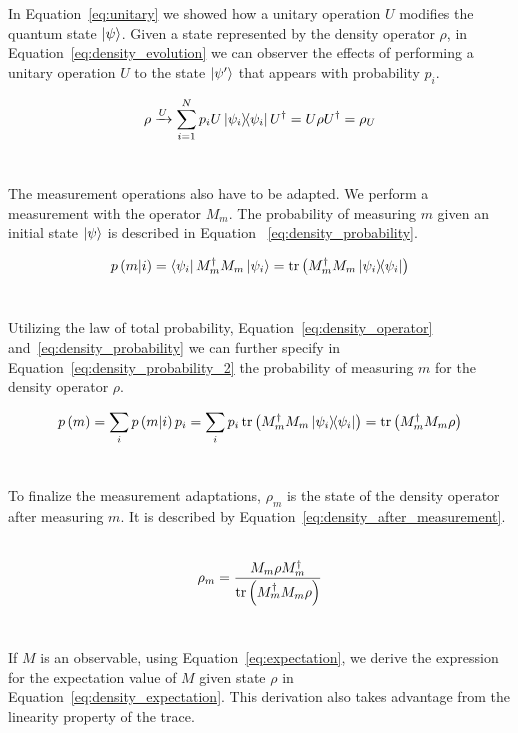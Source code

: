 In Equation~\ref{eq:unitary} we showed how a unitary operation \(U\) modifies
the quantum state \(\ket{\psi}\). Given a state represented by the density
operator \(\rho\), in Equation~\ref{eq:density_evolution} we can observer the
effects of performing a unitary operation \(U\) to the state \(\ket{\psi'}\)
that appears with probability \(p_i\). \

\begin{equation}\label{eq:density_evolution}
  \rho \xrightarrow{U} \sum_{i=1}^{N}p_{i}U\ketbra{\psi_i}{\psi_i}U^{\dag} =
  U\rho U^{\dag} = \rho_{U}
\end{equation} \

The measurement operations also have to be adapted. We perform a
measurement with the operator \(M_m\). The probability of measuring
\(m\) given an initial state \(\ket{\psi}\) is described in Equation
~\ref{eq:density_probability}. \

\begin{equation}\label{eq:density_probability}
  p\left(m|i\right) = \bra{\psi_i}M_{m}^{\dag}M_{m}\ket{\psi_i} =
  \trace\left(M_{m}^{\dag}M_{m}\ketbra{\psi_i}{\psi_i}\right)
\end{equation} \

Utilizing the law of total probability, Equation~\ref{eq:density_operator}
and~\ref{eq:density_probability} we can further specify in 
Equation~\ref{eq:density_probability_2} the probability of measuring
\(m\) for the density operator \(\rho\). \

\begin{equation}\label{eq:density_probability_2}
  p\left(m\right) = \sum_{i}p\left(m|i\right)p_{i} =
  \sum_{i}p_{i}\trace\left(M_{m}^{\dag}M_{m}\ketbra{\psi_i}{\psi_i}\right) =
  \trace\left(M_{m}^{\dag}M_{m}\rho \right)
\end{equation} \

To finalize the measurement adaptations, \(\rho_m\) is the state of
the density operator after measuring \(m\). It is described by
Equation~\ref{eq:density_after_measurement}. \

\begin{equation}\label{eq:density_after_measurement}
  \rho_m = 
  \frac{M_{m}\rho M_{m}^{\dag}}{\trace\left(M_{m}^{\dag}M_{m}\rho\right)}
\end{equation} \

If \(M\) is an observable, using Equation~\ref{eq:expectation}, we derive
the expression for the expectation value of \(M\) given state \(\rho\)
in Equation~\ref{eq:density_expectation}. This derivation also takes 
advantage from the linearity property of the trace. \

